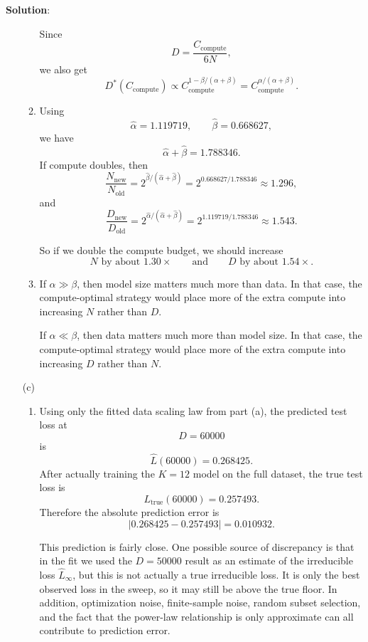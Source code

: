 \documentclass[submit]{harvardml}
\newenvironment{solution}{
    \vspace{2mm}
    \color{blue}\noindent\textbf{Solution}:
}{}
\begin{document}
\begin{solution}
\begin{enumerate}
\begin{enumerate}
        Since
        \[
        D = \frac{C_{\text{compute}}}{6N},
        \]
        we also get
        \[
        D^*(C_{\text{compute}})
        \propto
        C_{\text{compute}}^{1-\beta/(\alpha+\beta)}
        =
        C_{\text{compute}}^{\alpha/(\alpha+\beta)}.
        \]

        \item Using
        \[
        \hat\alpha = 1.119719,
        \qquad
        \hat\beta = 0.668627,
        \]
        we have
        \[
        \hat\alpha + \hat\beta = 1.788346.
        \]
        If compute doubles, then
        \[
        \frac{N_{\text{new}}}{N_{\text{old}}}
        =
        2^{\hat\beta/(\hat\alpha+\hat\beta)}
        =
        2^{0.668627/1.788346}
        \approx 1.296,
        \]
        and
        \[
        \frac{D_{\text{new}}}{D_{\text{old}}}
        =
        2^{\hat\alpha/(\hat\alpha+\hat\beta)}
        =
        2^{1.119719/1.788346}
        \approx 1.543.
        \]

        So if we double the compute budget, we should increase
        \[
        N \text{ by about } 1.30\times
        \qquad\text{and}\qquad
        D \text{ by about } 1.54\times.
        \]

        \item If $\alpha \gg \beta$, then model size matters much more than data. In that case, the compute-optimal strategy would place more of the extra compute into increasing $N$ rather than $D$.

        If $\alpha \ll \beta$, then data matters much more than model size. In that case, the compute-optimal strategy would place more of the extra compute into increasing $D$ rather than $N$.
    \end{enumerate}

    \item[(c)]
    \begin{enumerate}
        \item Using only the fitted data scaling law from part (a), the predicted test loss at
        \[
        D=60000
        \]
        is
        \[
        \hat L(60000) = 0.268425.
        \]
        After actually training the $K=12$ model on the full dataset, the true test loss is
        \[
        L_{\text{true}}(60000)=0.257493.
        \]
        Therefore the absolute prediction error is
        \[
        |0.268425 - 0.257493| = 0.010932.
        \]

        This prediction is fairly close. One possible source of discrepancy is that in the fit we used the $D=50000$ result as an estimate of the irreducible loss $\hat L_\infty$, but this is not actually a true irreducible loss. It is only the best observed loss in the sweep, so it may still be above the true floor. In addition, optimization noise, finite-sample noise, random subset selection, and the fact that the power-law relationship is only approximate can all contribute to prediction error.


\end{enumerate}
\end{enumerate}
\end{solution}
\end{document}
